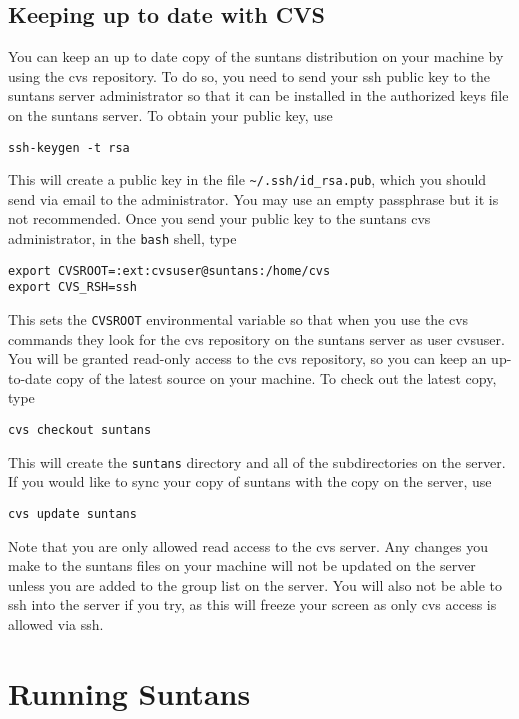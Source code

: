\documentclass[12pt,oneside]{article}
\begin{document}
\subsection{Keeping up to date with CVS}

You can keep an up to date copy of the suntans distribution on your machine by using the
cvs repository.  To do so, you need to send your ssh public key to the suntans server administrator so that
it can be installed in the authorized keys file on the suntans server.  To obtain your
public key, use
\begin{verbatim}
ssh-keygen -t rsa
\end{verbatim}
This will create a public key in the file \verb+~/.ssh/id_rsa.pub+, which you should send
via email to the administrator.  You may use an empty passphrase but it is not recommended.
Once you send your public key to the suntans cvs administrator, in the \verb+bash+ shell, type
\begin{verbatim}
export CVSROOT=:ext:cvsuser@suntans:/home/cvs
export CVS_RSH=ssh
\end{verbatim}
This sets the \verb+CVSROOT+ environmental variable so that when you use the cvs commands
they look for the cvs repository on the suntans server as user cvsuser.
You will be granted read-only access to the cvs repository, so you can keep an up-to-date
copy of the latest source on your machine.  To check out the latest copy, type
\begin{verbatim}
cvs checkout suntans
\end{verbatim}
This will create the \verb+suntans+ directory and all of the subdirectories on the server.
If you would like to sync your copy of suntans with the copy on the server, use
\begin{verbatim}
cvs update suntans
\end{verbatim}
Note that you are only allowed read access to the cvs server.  Any changes you make to
the suntans files on your machine will not be updated on the server unless you are added
to the group list on the server.  You will also not be able to ssh into the server if you
try, as this will freeze your screen as only cvs access is allowed via ssh.

\section{Running Suntans}
\end{document}
